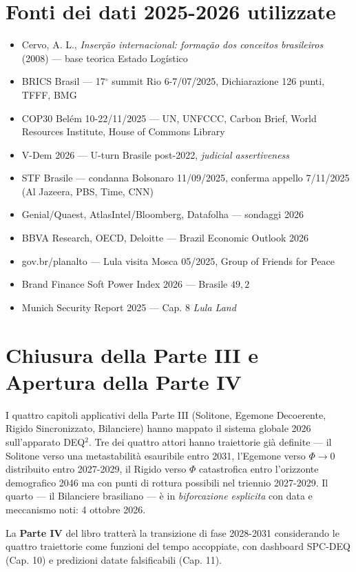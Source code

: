 \section{Fonti dei dati 2025-2026
utilizzate}\label{fonti-dei-dati-2025-2026-utilizzate}

\begin{itemize}
\tightlist
\item
  Cervo, A. L., \emph{Inserção internacional: formação dos conceitos
  brasileiros} (2008) --- base teorica Estado Logístico
\item
  BRICS Brasil --- 17$^\circ$ summit Rio 6-7/07/2025, Dichiarazione 126 punti,
  TFFF, BMG
\item
  COP30 Belém 10-22/11/2025 --- UN, UNFCCC, Carbon Brief, World
  Resources Institute, House of Commons Library
\item
  V-Dem 2026 --- U-turn Brasile post-2022, \emph{judicial assertiveness}
\item
  STF Brasile --- condanna Bolsonaro 11/09/2025, conferma appello
  7/11/2025 (Al Jazeera, PBS, Time, CNN)
\item
  Genial/Quaest, AtlasIntel/Bloomberg, Datafolha --- sondaggi 2026
\item
  BBVA Research, OECD, Deloitte --- Brazil Economic Outlook 2026
\item
  gov.br/planalto --- Lula visita Mosca 05/2025, Group of Friends for
  Peace
\item
  Brand Finance Soft Power Index 2026 --- Brasile \(49{,}2\)
\item
  Munich Security Report 2025 --- Cap. 8 \emph{Lula Land}
\end{itemize}



\section{Chiusura della Parte III e Apertura della Parte
IV}\label{chiusura-della-parte-iii-e-apertura-della-parte-iv}

I quattro capitoli applicativi della Parte III (Solitone, Egemone
Decoerente, Rigido Sincronizzato, Bilanciere) hanno mappato il sistema
globale 2026 sull'apparato DEQ$^2$. Tre dei quattro attori hanno
traiettorie già definite --- il Solitone verso una metastabilità
esauribile entro 2031, l'Egemone verso \(\Phi \to 0\) distribuito entro
2027-2029, il Rigido verso \(\Phi\) catastrofica entro l'orizzonte
demografico 2046 ma con punti di rottura possibili nel triennio
2027-2029. Il quarto --- il Bilanciere brasiliano --- è in
\emph{biforcazione esplicita} con data e meccanismo noti: 4 ottobre
2026.

La \textbf{Parte IV} del libro tratterà la transizione di fase 2028-2031
considerando le quattro traiettorie come funzioni del tempo accoppiate,
con dashboard SPC-DEQ (Cap. 10) e predizioni datate falsificabili (Cap.
11).


